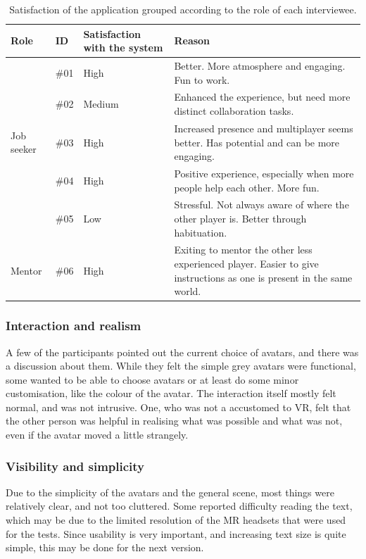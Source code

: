 \begin{table}[!h]
      \centering
        \begin{tabular}{llp{2.5cm}p{5cm}}
        \toprule
        Role & ID & Satisfaction with the system & Reason\\
        \midrule
         & \#01 & High & Better. More atmosphere and engaging. Fun to work.\\\vspace{0.2cm}
         & \#02  & Medium & Enhanced the experience, but need more distinct collaboration tasks.\\\vspace{0.2cm}
         Job seeker & \#03  & High & Increased presence and multiplayer seems better. Has potential and can be more engaging.\\\vspace{0.2cm}
         & \#04 & High & Positive experience, especially when more people help each other. More fun.  \\\vspace{0.2cm}
         & \#05  & Low & Stressful. Not always aware of where the other player is. Better through habituation. \\\midrule
        Mentor & \#06  & High &  Exiting to mentor the other less experienced player. Easier to give instructions as one is present in the same world. \\
        \bottomrule
        \end{tabular}
        \caption{Satisfaction of the application grouped according to the role of each interviewee.}
        \label{table:satificationInterview1}
\end{table}


\subsubsection{Interaction and realism}
A few of the participants pointed out the current choice of avatars, and there was a discussion about them. While they felt the simple grey avatars were functional, some wanted to be able to choose avatars or at least do some minor customisation, like the colour of the avatar. The interaction itself mostly felt normal, and was not intrusive. One, who was not a accustomed to VR, felt that the other person was helpful in realising what was possible and what was not, even if the avatar moved a little strangely.

\subsubsection{Visibility and simplicity}
Due to the simplicity of the avatars and the general scene, most things were relatively clear, and not too cluttered. Some reported difficulty reading the text, which may be due to the limited resolution of the MR headsets that were used for the tests. Since usability is very important, and increasing text size is quite simple, this may be done for the next version.

